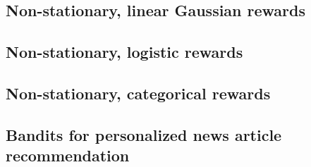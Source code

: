 \subsection{Non-stationary, linear Gaussian rewards}
\label{ssec:dynamic_bandits_gaussian}


\clearpage
\subsection{Non-stationary, logistic rewards}
\label{ssec:dynamic_bandits_logistic}


\clearpage
\subsection{Non-stationary, categorical rewards}
\label{ssec:dynamic_bandits_categorical}


\subsection{Bandits for personalized news article recommendation}
\label{ssec:logged_data_bandits}

